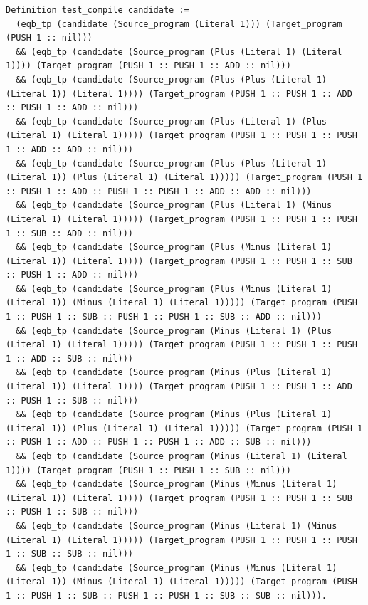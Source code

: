 \documentclass{article}
\begin{document}
\begin{lstlisting}
Definition test_compile candidate :=
  (eqb_tp (candidate (Source_program (Literal 1))) (Target_program (PUSH 1 :: nil)))
  && (eqb_tp (candidate (Source_program (Plus (Literal 1) (Literal 1)))) (Target_program (PUSH 1 :: PUSH 1 :: ADD :: nil)))
  && (eqb_tp (candidate (Source_program (Plus (Plus (Literal 1) (Literal 1)) (Literal 1)))) (Target_program (PUSH 1 :: PUSH 1 :: ADD :: PUSH 1 :: ADD :: nil)))
  && (eqb_tp (candidate (Source_program (Plus (Literal 1) (Plus (Literal 1) (Literal 1))))) (Target_program (PUSH 1 :: PUSH 1 :: PUSH 1 :: ADD :: ADD :: nil)))
  && (eqb_tp (candidate (Source_program (Plus (Plus (Literal 1) (Literal 1)) (Plus (Literal 1) (Literal 1))))) (Target_program (PUSH 1 :: PUSH 1 :: ADD :: PUSH 1 :: PUSH 1 :: ADD :: ADD :: nil)))
  && (eqb_tp (candidate (Source_program (Plus (Literal 1) (Minus (Literal 1) (Literal 1))))) (Target_program (PUSH 1 :: PUSH 1 :: PUSH 1 :: SUB :: ADD :: nil)))
  && (eqb_tp (candidate (Source_program (Plus (Minus (Literal 1) (Literal 1)) (Literal 1)))) (Target_program (PUSH 1 :: PUSH 1 :: SUB :: PUSH 1 :: ADD :: nil)))
  && (eqb_tp (candidate (Source_program (Plus (Minus (Literal 1) (Literal 1)) (Minus (Literal 1) (Literal 1))))) (Target_program (PUSH 1 :: PUSH 1 :: SUB :: PUSH 1 :: PUSH 1 :: SUB :: ADD :: nil)))
  && (eqb_tp (candidate (Source_program (Minus (Literal 1) (Plus (Literal 1) (Literal 1))))) (Target_program (PUSH 1 :: PUSH 1 :: PUSH 1 :: ADD :: SUB :: nil)))
  && (eqb_tp (candidate (Source_program (Minus (Plus (Literal 1) (Literal 1)) (Literal 1)))) (Target_program (PUSH 1 :: PUSH 1 :: ADD :: PUSH 1 :: SUB :: nil)))
  && (eqb_tp (candidate (Source_program (Minus (Plus (Literal 1) (Literal 1)) (Plus (Literal 1) (Literal 1))))) (Target_program (PUSH 1 :: PUSH 1 :: ADD :: PUSH 1 :: PUSH 1 :: ADD :: SUB :: nil)))
  && (eqb_tp (candidate (Source_program (Minus (Literal 1) (Literal 1)))) (Target_program (PUSH 1 :: PUSH 1 :: SUB :: nil)))
  && (eqb_tp (candidate (Source_program (Minus (Minus (Literal 1) (Literal 1)) (Literal 1)))) (Target_program (PUSH 1 :: PUSH 1 :: SUB :: PUSH 1 :: SUB :: nil)))
  && (eqb_tp (candidate (Source_program (Minus (Literal 1) (Minus (Literal 1) (Literal 1))))) (Target_program (PUSH 1 :: PUSH 1 :: PUSH 1 :: SUB :: SUB :: nil)))
  && (eqb_tp (candidate (Source_program (Minus (Minus (Literal 1) (Literal 1)) (Minus (Literal 1) (Literal 1))))) (Target_program (PUSH 1 :: PUSH 1 :: SUB :: PUSH 1 :: PUSH 1 :: SUB :: SUB :: nil))).
\end{lstlisting}
\end{document}
